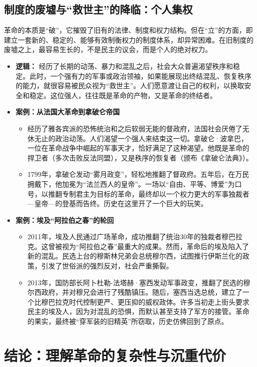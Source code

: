\subsection{ 制度的废墟与“救世主”的降临：个人集权}

革命的本质是“破”，它摧毁了旧有的法律、制度和权力结构。但在“立”的方面，即建立一套新的、稳定的、能够有效制衡权力的制度体系，却异常困难。在旧制度的废墟之上，最容易生长的，不是民主的议会，而是个人的绝对权力。
\begin{itemize}
\item \textbf{逻辑：} 经历了长期的动荡、暴力和混乱之后，社会大众普遍渴望秩序和稳定。此时，一个强有力的军事或政治领袖，如果能展现出终结混乱、恢复秩序的能力，就很容易被民众视为“救世主”。人们愿意渡让自己的权利，以换取安全和稳定。这位强人，往往既是革命的产物，又是革命的终结者。
\item \textbf{案例：从法国大革命到拿破仑帝国}
    \begin{itemize}
    \item 经历了雅各宾派的恐怖统治和之后软弱无能的督政府，法国社会厌倦了无休无止的政治动荡。人们渴望一个强人来结束这一切。拿破仑·波拿巴，一位在革命战争中崛起的军事天才，恰好满足了这种渴望。他既是革命的捍卫者（多次击败反法同盟），又是秩序的恢复者（颁布《拿破仑法典》）。
    \item 1799年，拿破仑发动“雾月政变”，轻松地推翻了督政府。五年后，在万民拥戴下，他加冕为“法兰西人的皇帝”。一场以“自由、平等、博爱”为口号，以推翻专制君主为目标的革命，最终却以一个权力更大的军事独裁者---皇帝---的登基而告终。历史在这里开了一个巨大的玩笑。
    \end{itemize}
\item \textbf{案例：埃及“阿拉伯之春”的轮回}
    \begin{itemize}
    \item 2011年，埃及人民通过广场革命，成功推翻了统治30年的独裁者穆巴拉克。这曾被视为“阿拉伯之春”最重大的成果。然而，革命后的埃及陷入了新的混乱。民选上台的穆斯林兄弟会总统穆尔西，试图推行伊斯兰化的政策，引发了世俗派的强烈反对，社会严重撕裂。
    \item 2013年，国防部长阿卜杜勒-法塔赫·塞西发动军事政变，推翻了民选的穆尔西政府，并对穆兄会进行了残酷镇压。随后，塞西当选总统，建立了一个比穆巴拉克时代控制更严、更压抑的威权政体。许多当初走上街头要求民主的埃及人，因为对混乱的恐惧，而默认甚至支持了军方的接管。革命的果实，最终被“穿军装的旧精英”所窃取，历史仿佛回到了原点。
    \end{itemize}
\end{itemize}

\section{ 结论：理解革命的复杂性与沉重代价}


